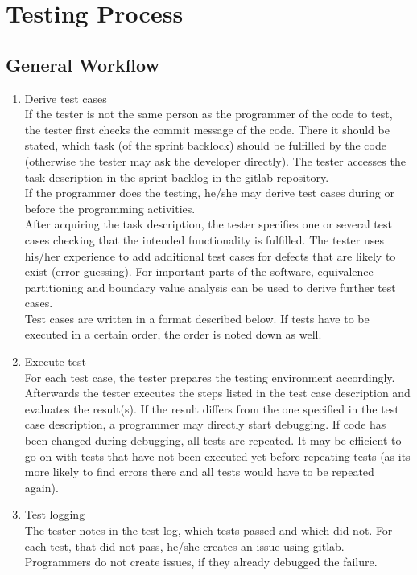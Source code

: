 \documentclass[twoside,12pt,a4paper]{article}
\begin{document}
\newpage

\section{Testing Process} %
\label{sec:testing_process}

\subsection{General Workflow} %
\label{sub:general_workflow}

\begin{enumerate}
 	\item Derive test cases \\
 	If the tester is not the same person as the programmer of the code to test, the tester first checks the commit message of the code. There it should be stated, which task (of the sprint backlock) should be fulfilled by the code (otherwise the tester may ask the developer directly). The tester accesses the task description in the sprint backlog in the gitlab repository. \\
 	If the programmer does the testing, he/she may derive test cases during or before the programming activities. \\
 	After acquiring the task description, the tester specifies one or several test cases checking that the intended functionality is fulfilled. The tester uses his/her experience to add additional test cases for defects that are likely to exist (error guessing). For important parts of the software, equivalence partitioning and boundary value analysis can be used to derive further test cases. \\
 	Test cases are written in a format described below. If tests have to be executed in a certain order, the order is noted down as well.

 	\item Execute test \\
 	For each test case, the tester prepares the testing environment accordingly. Afterwards the tester executes the steps listed in the test case description and evaluates the result(s). If the result differs from the one specified in the test case description, a programmer may directly start debugging. If code has been changed during debugging, all tests are repeated. It may be efficient to go on with tests that have not been executed yet before repeating tests (as its more likely to find errors there and all tests would have to be repeated again).

 	\item Test logging \\
 	The tester notes in the test log, which tests passed and which did not. For each test, that did not pass, he/she creates an issue using gitlab. Programmers do not create issues, if they already debugged the failure.

\end{enumerate}
\end{document}
